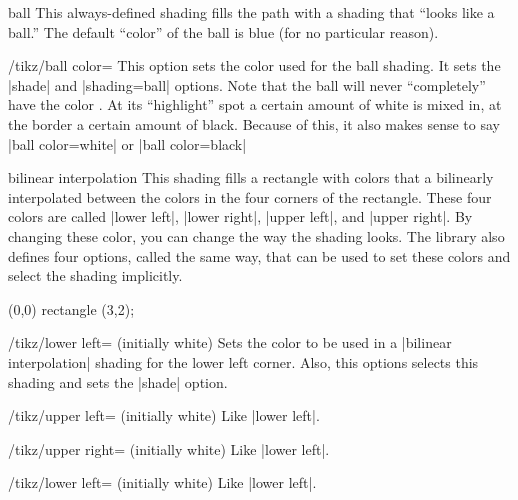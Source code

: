 \begin{shading}{ball}
  This always-defined shading fills the path with a shading that ``looks like a
  ball.'' The default ``color'' of the ball is blue (for no
  particular reason).
  
  \begin{key}{/tikz/ball color=}
    This option sets the color used for the ball shading. It sets the
    |shade| and |shading=ball| options. Note that the ball will never
    ``completely'' have the color . At its ``highlight'' spot
    a certain amount of white is mixed in, at the border a certain
    amount of black. Because of this, it also makes sense to say
    |ball color=white| or |ball color=black|
    
\begin{codeexample}[]
\end{codeexample}
  \end{key}
\end{shading}



\begin{shading}{bilinear interpolation}
  This shading fills a rectangle with colors that a bilinearly
  interpolated between the colors in the four corners of the
  rectangle. These four colors are called |lower left|, |lower right|,
  |upper left|, and |upper right|. By changing these color, you can
  change the way the shading looks. The library also defines four
  options, called the same way, that can be used to set these colors
  and select the shading implicitly.

\begin{codeexample}[]
\tikz
  \shade[upper left=red,upper right=green,
         lower left=blue,lower right=yellow]
    (0,0) rectangle (3,2);
\end{codeexample}

  \begin{key}{/tikz/lower left= (initially white)}
    Sets the color to be used in a |bilinear interpolation| shading
    for the lower left corner. Also, this options selects this shading
    and sets the |shade| option.
  \end{key}

  \begin{key}{/tikz/upper left= (initially white)}
    Like |lower left|.
  \end{key}
  \begin{key}{/tikz/upper right= (initially white)}
    Like |lower left|.
  \end{key}
  \begin{key}{/tikz/lower left= (initially white)}
    Like |lower left|.
  \end{key}
\end{shading}


